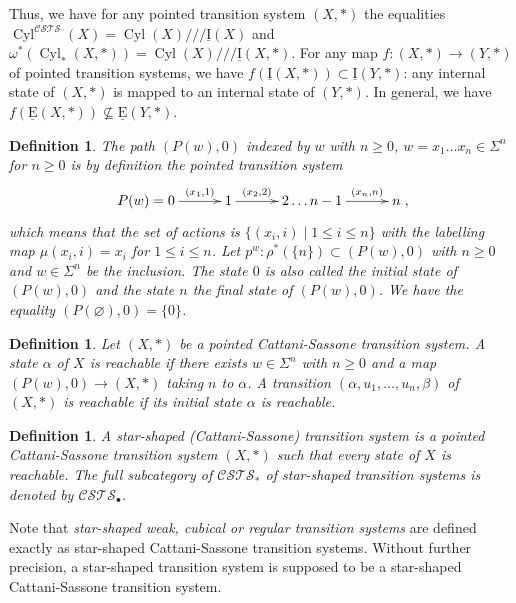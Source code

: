 \documentclass[a4paper,12pt]{amsart}
\newtheorem{defn}[thm]{Definition}
\begin{document}
Thus, we have for any pointed transition system $(X,*)$ the equalities
$\operatorname{{Cyl}}^{\mathcal{C\!S\!T\!S}}(X)=\operatorname{{Cyl}}(X)///\operatorname{\underline{I}}(X)$ and
$\omega^*(\operatorname{{Cyl}}_*(X,*))=\operatorname{{Cyl}}(X)///\operatorname{\underline{I}}(X,*)$. For any map $f:(X,*)\to
(Y,*)$ of pointed transition systems, we have $f(\operatorname{\underline{I}}(X,*)) \subset
\operatorname{\underline{I}}(Y,*)$: any internal state of $(X,*)$ is mapped to an internal
state of $(Y,*)$. In general, we have $f(\operatorname{\underline{E}}(X,*)) \nsubseteq
\operatorname{\underline{E}}(Y,*)$.

\begin{defn} \emph{The path} $(P(w),0)$ indexed by $w$ with $n{\geqslant} 0$,
$w=x_1\dots x_n \in \Sigma^n$ for $n{\geqslant} 0$ is by definition the
pointed transition system \[\xymatrix@C=3em{P(w)=0 {\ar@{->}[r]^-{{(x_1,1)}}}& 1
  {\ar@{->}[r]^-{{(x_2,2)}}}& 2 \dots n-1{\ar@{->}[r]^-{{(x_n,n)}}}& n},\] which means that the
set of actions is $\{(x_i,i)\mid 1 {\leqslant} i {\leqslant} n\}$ with the labelling
map $\mu(x_i,i) = x_i$ for $1 {\leqslant} i {\leqslant} n$. Let $p^w:\rho^*(\{n\})
\subset (P(w),0)$ with $n {\geqslant} 0$ and $w\in \Sigma^n$ be the
inclusion. The state $0$ is also called the \emph{initial state} of
$(P(w),0)$ and the state $n$ the \emph{final state} of $(P(w),0)$. We
have the equality $(P(\varnothing),0)=\{0\}$. \end{defn}

\begin{defn} Let $(X,*)$ be a pointed Cattani-Sassone transition system. A
state $\alpha$ of $X$ is {\rm reachable} if there exists $w\in
\Sigma^n$ with $n{\geqslant} 0$ and a map $(P(w),0) \to (X,*)$ taking $n$ to
$\alpha$.  A transition $(\alpha,u_1,\dots,u_n,\beta)$ of $(X,*)$ is
{\rm reachable} if its initial state $\alpha$ is reachable.  \end{defn}

\begin{defn} A {\rm star-shaped (Cattani-Sassone) transition system} is a
pointed Cattani-Sassone transition system $(X,*)$ such that every
state of $X$ is reachable. The full subcategory of ${\mathcal{C\!S\!T\!S}}_*$ of
star-shaped transition systems is denoted by ${\mathcal{C\!S\!T\!S}}_{\bullet}$. \end{defn}

Note that \emph{star-shaped weak, cubical or regular transition
  systems} are defined exactly as star-shaped Cattani-Sassone
transition systems. Without further precision, a star-shaped
transition system is supposed to be a star-shaped Cattani-Sassone
transition system.
\end{document}
